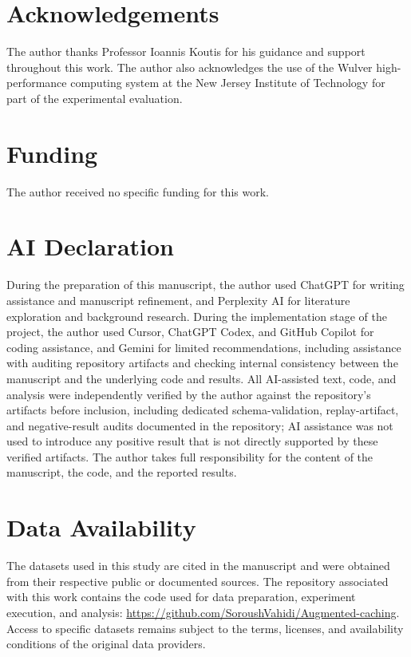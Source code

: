 \documentclass[preprint,12pt]{elsarticle}
\begin{document}
\section*{Acknowledgements}

The author thanks Professor Ioannis Koutis for his guidance and support throughout this work. The author also acknowledges the use of the Wulver high-performance computing system at the New Jersey Institute of Technology for part of the experimental evaluation.

\section*{Funding}

The author received no specific funding for this work.

\section*{AI Declaration}

During the preparation of this manuscript, the author used ChatGPT for writing assistance and manuscript refinement, and Perplexity AI for literature exploration and background research. During the implementation stage of the project, the author used Cursor, ChatGPT Codex, and GitHub Copilot for coding assistance, and Gemini for limited recommendations, including assistance with auditing repository artifacts and checking internal consistency between the manuscript and the underlying code and results. All AI-assisted text, code, and analysis were independently verified by the author against the repository's artifacts before inclusion, including dedicated schema-validation, replay-artifact, and negative-result audits documented in the repository; AI assistance was not used to introduce any positive result that is not directly supported by these verified artifacts. The author takes full responsibility for the content of the manuscript, the code, and the reported results.

\section*{Data Availability}

The datasets used in this study are cited in the manuscript and were obtained from their respective public or documented sources. The repository associated with this work contains the code used for data preparation, experiment execution, and analysis:
\url{https://github.com/SoroushVahidi/Augmented-caching}.
Access to specific datasets remains subject to the terms, licenses, and availability conditions of the original data providers.
\end{document}
